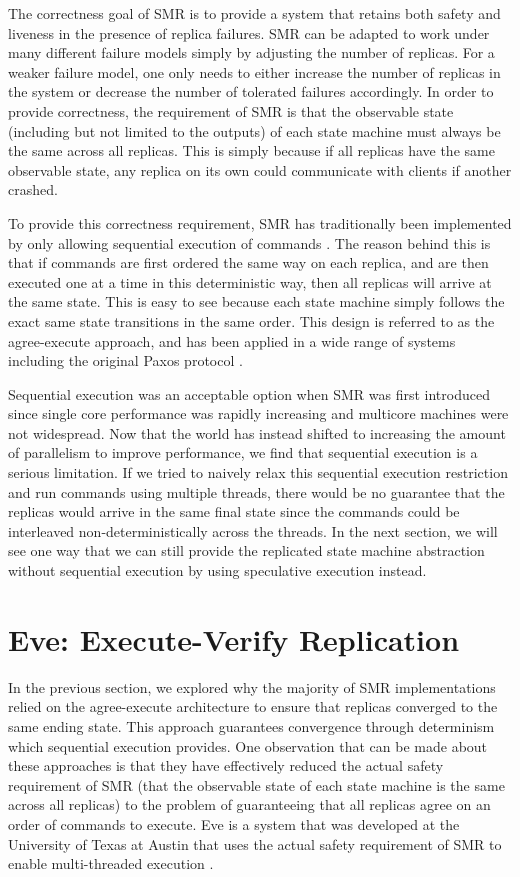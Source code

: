 \documentclass[11pt, oneside]{report}
\begin{document}
The correctness goal of SMR is to provide a system that retains both safety and liveness in the presence of replica failures. 
SMR can be adapted to work under many different failure models simply by adjusting the number of replicas. 
For a weaker failure model, one only needs to either increase the number of replicas in the system or decrease the number of tolerated failures accordingly. 
In order to provide correctness, the requirement of SMR is that the observable state (including but not limited to the outputs) of each state machine must always be the same across all replicas. 
This is simply because if all replicas have the same observable state, any replica on its own could communicate with clients if another crashed.

To provide this correctness requirement, SMR has traditionally been implemented by only allowing sequential execution of commands \cite{paxos, paxosMadeSimple, schneider}. 
The reason behind this is that if commands are first ordered the same way on each replica, and are then executed one at a time in this deterministic way, then all replicas will arrive at the same state. 
This is easy to see because each state machine simply follows the exact same state transitions in the same order. 
This design is referred to as the agree-execute approach, and has been applied in a wide range of systems including the original Paxos protocol \cite{paxos}.

Sequential execution was an acceptable option when SMR was first introduced since single core performance was rapidly increasing and multicore machines were not widespread. 
Now that the world has instead shifted to increasing the amount of parallelism to improve performance, we find that sequential execution is a serious limitation. 
If we tried to naively relax this sequential execution restriction and run commands using multiple threads, there would be no guarantee that the replicas would arrive in the same final state since the commands could be interleaved non-deterministically across the threads. 
In the next section, we will see one way that we can still provide the replicated state machine abstraction without sequential execution by using speculative execution instead. 
 

\section{Eve: Execute-Verify Replication}

In the previous section, we explored why the majority of SMR implementations relied on the agree-execute architecture to ensure that replicas converged to the same ending state. 
This approach guarantees convergence through determinism which sequential execution provides. 
One observation that can be made about these approaches is that they have effectively reduced the actual safety requirement of SMR (that the observable state of each state machine is the same across all replicas) to the problem of guaranteeing that all replicas agree on an order of commands to execute. 
Eve is a system that was developed at the University of Texas at Austin that uses the actual safety requirement of SMR to enable multi-threaded execution \cite{manosThesis, eve}.
\end{document}
